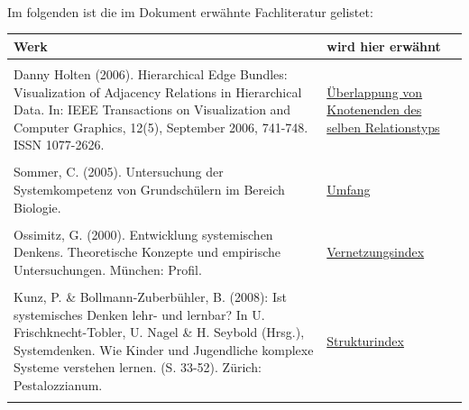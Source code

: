 \documentclass[enabledeprecatedfontcommands,fontsize=11pt,paper=a4,twoside]{scrartcl}
\begin{document}
\\ \\ \\
Im folgenden ist die im Dokument erwähnte Fachliteratur gelistet: \\
\begin{tabular}{p{11cm}p{5cm}}
	Werk & wird hier erwähnt \\ \hline \\
	Danny Holten (2006). Hierarchical Edge Bundles: Visualization of Adjacency Relations in Hierarchical Data. In: IEEE Transactions on Visualization and Computer Graphics, 12(5), September 2006, 741-748. ISSN 1077-2626. & \hyperlink{Überlappung von Knotenenden des selben Relationstyps}{Überlappung von Knotenenden des selben Relationstyps} \\ \\ 
	Sommer, C. (2005). Untersuchung der Systemkompetenz von Grundschülern im Bereich Biologie.& \hyperlink{Umfang}{Umfang} \\ \\
	Ossimitz, G. (2000). Entwicklung systemischen Denkens. Theoretische Konzepte und empirische Untersuchungen. München: Profil. & \hyperlink{Vernetzungsindex}{Vernetzungsindex} \\ \\
	Kunz, P. \& Bollmann-Zuberbühler, B. (2008): Ist systemisches Denken lehr- und lernbar? In U. Frischknecht-Tobler, U. Nagel \& H. Seybold (Hrsg.), Systemdenken. Wie Kinder und Jugendliche komplexe Systeme verstehen lernen. (S. 33-52). Zürich: Pestalozzianum. & \hyperlink{Strukturindex}{Strukturindex} \\ \\
\end{tabular}




\newpage
\end{document}
